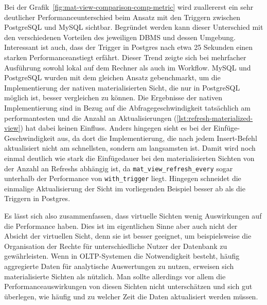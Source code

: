 Bei der Grafik~\ref{fig:mat-view-comparison-comp-metric} wird zuallererst ein sehr deutlicher Performanceunterschied beim Ansatz mit den Triggern zwischen PostgreSQL und MySQL sichtbar.
Begründet werden kann dieser Unterschied mit den verschiedenen Vorteilen des jeweiligen DBMS und dessen Umgebung.
Interessant ist auch, dass der Trigger in Postgres nach etwa 25 Sekunden einen starken Performanceanstiegt erfährt.
Dieser Trend zeigte sich bei mehrfacher Ausführung sowohl lokal auf dem Rechner als auch im Workflow.
MySQL und PostgreSQL wurden mit dem gleichen Ansatz gebenchmarkt, um die Implementierung der nativen materialisierten Sicht, die nur in PostgreSQL möglich ist, besser vergleichen zu können.
Die Ergebnisse der nativen Implementierung sind in Bezug auf die Abfragegeschwindigkeit tatsächlich am performantesten und die Anzahl an Aktualisierungen (\ref{lst:refresh-materialized-view}) hat dabei keinen Einfluss.
Anders hingegen sieht es bei der Einfüge-Geschwindigkeit aus, da dort die Implementierung, die nach jedem Insert-Befehl aktualisiert nicht am schnellsten, sondern am langsamsten ist.
Damit wird noch einmal deutlich wie stark die Einfügedauer bei den materialisierten Sichten von der Anzahl an Refreshs abhängig ist, da \texttt{mat\_view\_refresh\_every} sogar unterhalb der Performance von \texttt{with\_trigger} liegt.
Hingegen schneidet die einmalige Aktualisierung der Sicht im vorliegenden Beispiel besser ab als die Triggern in Postgres.

Es lässt sich also zusammenfassen, dass virtuelle Sichten wenig Auswirkungen auf die Performance haben.
Dies ist im eigentlichen Sinne aber auch nicht der Absicht der virtuellen Sicht, denn sie ist besser geeignet, um beispielsweise die Organisation der Rechte für unterschiedliche Nutzer der Datenbank zu gewährleisten.
Wenn in OLTP-Systemen die Notwendigkeit besteht, häufig aggregierte Daten für analytische Auswertungen zu nutzen, erweisen sich materialisierte Sichten als nützlich.
Man sollte allerdings vor allem die Performanceauswirkungen von diesen Sichten nicht unterschätzen und sich gut überlegen, wie häufig und zu welcher Zeit die Daten aktualisiert werden müssen.